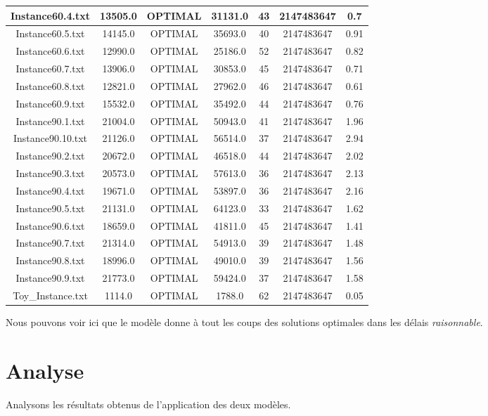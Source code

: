 \documentclass[10pt]{article}
\begin{document}
\begin{table}[h]
{\begin{tabular}{|c|c|c|c|c|c|c|}
\hline
Instance60.4.txt & 13505.0 & OPTIMAL & 31131.0 & 43 & 2147483647 & 0.7 \\
\hline
Instance60.5.txt & 14145.0 & OPTIMAL & 35693.0 & 40 & 2147483647 & 0.91 \\
\hline
Instance60.6.txt & 12990.0 & OPTIMAL & 25186.0 & 52 & 2147483647 & 0.82 \\
\hline
Instance60.7.txt & 13906.0 & OPTIMAL & 30853.0 & 45 & 2147483647 & 0.71 \\
\hline
Instance60.8.txt & 12821.0 & OPTIMAL & 27962.0 & 46 & 2147483647 & 0.61 \\
\hline
Instance60.9.txt & 15532.0 & OPTIMAL & 35492.0 & 44 & 2147483647 & 0.76 \\
\hline
Instance90.1.txt & 21004.0 & OPTIMAL & 50943.0 & 41 & 2147483647 & 1.96 \\
\hline
Instance90.10.txt & 21126.0 & OPTIMAL & 56514.0 & 37 & 2147483647 & 2.94 \\
\hline
Instance90.2.txt & 20672.0 & OPTIMAL & 46518.0 & 44 & 2147483647 & 2.02 \\
\hline
Instance90.3.txt & 20573.0 & OPTIMAL & 57613.0 & 36 & 2147483647 & 2.13 \\
\hline
Instance90.4.txt & 19671.0 & OPTIMAL & 53897.0 & 36 & 2147483647 & 2.16 \\
\hline
Instance90.5.txt & 21131.0 & OPTIMAL & 64123.0 & 33 & 2147483647 & 1.62 \\
\hline
Instance90.6.txt & 18659.0 & OPTIMAL & 41811.0 & 45 & 2147483647 & 1.41 \\
\hline
Instance90.7.txt & 21314.0 & OPTIMAL & 54913.0 & 39 & 2147483647 & 1.48 \\
\hline
Instance90.8.txt & 18996.0 & OPTIMAL & 49010.0 & 39 & 2147483647 & 1.56 \\
\hline
Instance90.9.txt & 21773.0 & OPTIMAL & 59424.0 & 37 & 2147483647 & 1.58 \\
\hline
Toy\_Instance.txt & 1114.0 & OPTIMAL & 1788.0 & 62 & 2147483647 & 0.05 \\
\hline
\end{tabular}%
  }

\end{table}

Nous pouvons voir ici que le modèle donne à tout les coups des solutions optimales dans les délais \textit{raisonnable}.

\section*{Analyse}
Analysons les résultats obtenus de l'application des deux modèles.
\end{document}
